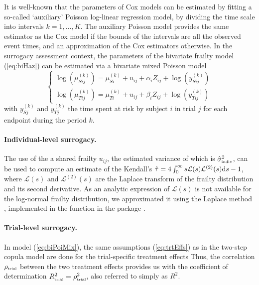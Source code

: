\documentclass[article,shortnames, nojss]{jss}\usepackage[]{graphicx}\usepackage[]{color}
\begin{document}
It is well-known \cite[see for instance][]{Whitehead80, crowtherEtal12}
  that the parameters of Cox models can be estimated by fitting
  a so-called `auxiliary' Poisson log-linear regression model,
  by dividing the time scale into intervals $k=1, \ldots, K$.
The auxiliary Poisson model provides the same estimator as the Cox model
  if the bounds of the intervals are all the observed event times,
  and an approximation of the Cox estimators otherwise.
In the surrogacy assessment context,
  the parameters of the bivariate frailty model (\ref{eq:biHaz})
  can be estimated via a bivariate mixed Poisson model
  \begin{equation}
    \begin{cases}
      \log\left( \mu_{S ij}^{(k)} \right) = 
        \mu_{S i}^{(k)}  + u_{ij}
        + \alpha_i Z_{ij}
        + \log\left(y_{S ij}^{(k)} \right)\\
      \log\left( \mu_{T ij}^{(k)} \right) = 
        \mu_{T i}^{(k)}  + u_{ij}
        + \beta_i Z_{ij}
        + \log\left(y_{T ij}^{(k)} \right)
    \end{cases}
    \label{eq:biPoiMix}
  \end{equation}
  with $y_{Sj}^{(k)}$ and $y_{Tj}^{(k)}$ the time spent at risk
  by subject $i$ in trial $j$ for each endpoint
  during the period $k$.


\paragraph{Individual-level surrogacy.}
The use of the a shared frailty $u_{ij}$,
the estimated variance of which  is $\hat\sigma^2_\text{\tiny indiv}$,
can be used to compute an estimate of the Kendall's
$\hat\tau = 4 \int_0^\infty s \mathcal L(s)\mathcal L^{(2)}(s) \textrm d s - 1$,
where $\mathcal L(s)$ and $\mathcal L^{(2)}(s)$
are the Laplace transform of the frailty distribution and its
second derivative.
As an analytic expression of $\mathcal L(s)$
is not available for the log-normal frailty distribution,
we approximated it using the Laplace method \citep{GoutisCasella99},
implemented in the  function
in the  package \citep{parfmJSS, R:parfm}.


\paragraph{Trial-level surrogacy.} \label{sec:trialDep}
In model (\ref{eq:biPoiMix}),
the same assumptions (\ref{eq:trtEffs})
as in the two-step copula model
are done for the trial-specific treatment effects
Thus, the correlation $\rho_\text{\tiny trial}$
between the two treatment effects provides us with 
the coefficient of determination
$R^2_\text{\tiny trial} = \rho^2_\text{\tiny trial}$,
also referred to simply as $R^2$.
\end{document}
